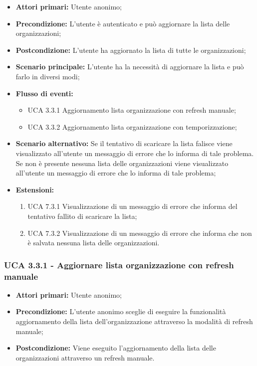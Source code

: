 \begin{itemize} 
	\item \textbf{Attori primari:} Utente anonimo;
	\item \textbf{Precondizione:} L'utente è autenticato e può aggiornare la lista delle organizzazioni;
	\item \textbf{Postcondizione:} L'utente ha aggiornato la lista di tutte le organizzazioni;
	\item \textbf{Scenario principale:}  L'utente ha la necessità di aggiornare la lista e può farlo in diversi modi;
	\item \textbf{Flusso di eventi:}
	\begin{itemize}
		\item UCA 3.3.1 Aggiornamento lista organizzazione con refresh manuale;
		\item UCA 3.3.2 Aggiornamento lista organizzazione con temporizzazione;
	\end{itemize}
	\item \textbf{Scenario alternativo:} Se il tentativo di scaricare la lista falisce viene visualizzato all'utente un messaggio di errore che lo informa di tale problema. Se non è presente nessuna lista delle organizzazioni viene visualizzato all'utente un messaggio di errore che lo informa di tale problema;
	\item \textbf{Estensioni:}
	\begin{enumerate}
		\item UCA 7.3.1 Visualizzazione di un messaggio di errore che informa del tentativo fallito di scaricare la lista;
		\item UCA 7.3.2 Visualizzazione di un messaggio di errore che informa che non è salvata nessuna lista delle organizzazioni.
	\end{enumerate}
\end{itemize}

\subsubsection{UCA 3.3.1 - Aggiornare lista organizzazione con refresh manuale}%
\begin{itemize}
	\item \textbf{Attori primari:} Utente anonimo;
	\item \textbf{Precondizione:} L'utente anonimo sceglie di eseguire la funzionalità aggiornamento della lista dell'organizzazione attraverso la modalità di refresh manuale;
	\item \textbf{Postcondizione:} Viene eseguito l'aggiornamento della lista delle organizzazioni attraverso un refresh manuale.
	
\end{itemize}

